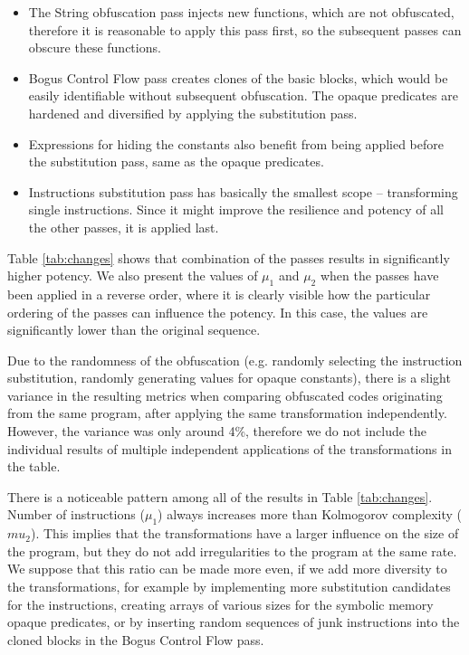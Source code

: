 \documentclass[
  digital, %
  notable,   %
  twoside, %
  nolof,     %
  nolot,     %
]{fithesis3}
\theoremstyle{definition}
\begin{document}
\begin{itemize}
    \item The String obfuscation pass injects new functions, which are not obfuscated, therefore it is reasonable to apply this pass first, so the subsequent passes can obscure these functions.
    \item Bogus Control Flow pass creates clones of the basic blocks, which would be easily identifiable without subsequent obfuscation. The opaque predicates are hardened and diversified by applying the substitution pass. 
    \item Expressions for hiding the constants also benefit from being applied before the substitution pass, same as the opaque predicates.
    \item Instructions substitution pass has basically the smallest scope -- transforming single instructions. Since it might improve the resilience and potency of all the other passes, it is applied last.
\end{itemize}

Table \ref{tab:changes} shows that combination of the passes results in significantly higher potency. We also present the values of $\mu_1$ and $\mu_2$ when the passes have been applied in a reverse order, where it is clearly visible how the particular ordering of the passes can influence the potency. In this case, the values are significantly lower than the original sequence. 

Due to the randomness of the obfuscation (e.g. randomly selecting the instruction substitution, randomly generating values for opaque constants), there is a slight variance in the resulting metrics when comparing obfuscated codes originating from the same program, after applying the same transformation independently. However, the variance was only around 4\%, therefore we do not include the individual results of multiple independent applications of the transformations in the table.

There is a noticeable pattern among all of the results in Table \ref{tab:changes}. Number of instructions ($\mu_1$) always increases more than Kolmogorov complexity ($mu_2$). This implies that the transformations have a larger influence on the size of the program, but they do not add irregularities to the program at the same rate. We suppose that this ratio can be made more even, if we add more diversity to the transformations, for example by implementing more substitution candidates for the instructions, creating arrays of various sizes for the symbolic memory opaque predicates, or by inserting random sequences of junk instructions into the cloned blocks in the Bogus Control Flow pass.
\end{document}
